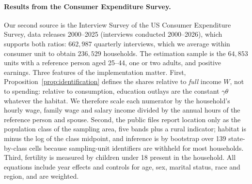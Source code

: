 \documentclass[11pt]{article}
\begin{document}
\paragraph{Results from the Consumer Expenditure Survey.}
Our second source is the Interview Survey of the US Consumer Expenditure Survey, data releases 2000--2025 (interviews conducted 2000--2026), which
supports both ratios: $662{,}987$ quarterly interviews, which we average within consumer
unit to obtain $236{,}529$ households. The estimation sample is the $64{,}853$ units with a
reference person aged 25--44, one or two adults, and positive earnings. Three features of the
implementation matter. First, Proposition~\ref{prop:identification} defines the shares relative to
\emph{full} income $W$, not to spending: relative to consumption, education outlays are the
constant $\gamma\theta$ whatever the habitat. We therefore scale each numerator by the household's
hourly wage, family wage and salary income divided by the annual hours of the reference person and
spouse. Second, the public files report location only as the population class of the sampling
area, five bands plus a rural indicator; habitat is minus the log of the class midpoint, and
inference is by bootstrap over 139 state-by-class cells because sampling-unit identifiers are
withheld for most households. Third, fertility is measured by children under 18 present in the
household. All equations include year effects and controls for age, sex, marital status, race and
region, and are weighted.
\end{document}
